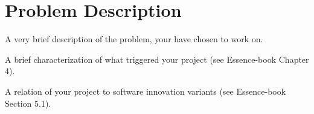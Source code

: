 \section{Problem Description}
A very brief description of the problem, your have chosen to work on.

A brief characterization of what triggered your project (see Essence-book Chapter 4).

A relation of your project to software innovation variants (see Essence-book Section 5.1).
